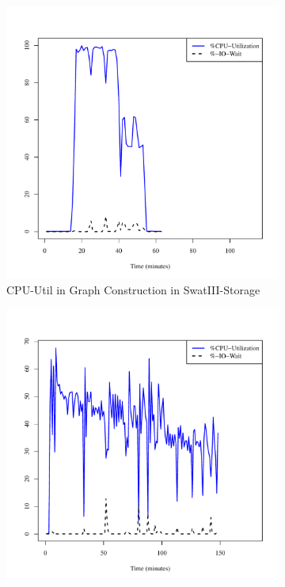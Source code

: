 \documentclass[conference]{IEEEtran}
\begin{document}
\begin{figure}[htb]
        \begin{subfigure}[b]{0.3\textwidth}
                \includegraphics[width=\textwidth]{Figure/SystemData/Plots/BGCPUSSD.pdf}
                \caption{CPU-Util in Graph Construction in SwatIII-Storage}
                \label{fig:BGCPUSSD}
        \end{subfigure}    
        \begin{subfigure}[b]{0.3\textwidth}
                \includegraphics[width=\textwidth]{Figure/SystemData/Plots/ECCPUSSD.pdf}

\end{subfigure}
\end{figure}
\end{document}
